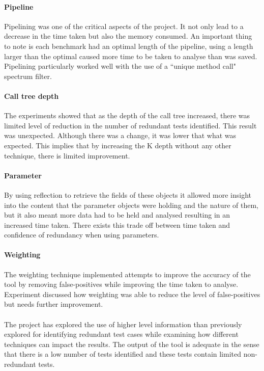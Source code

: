 \paragraph{Pipeline}
Pipelining was one of the critical aspects of the project. It not only lead to a decrease in the time taken but also the memory consumed. An important thing to note is each benchmark had an optimal length of the pipeline, using a length larger than the optimal caused more time to be taken to analyse than was saved. Pipelining particularly worked well with the use of a ``unique method call" spectrum filter.

\paragraph{Call tree depth}
The experiments showed that as the depth of the call tree increased, there was limited level of reduction in the number of redundant tests identified. This result was unexpected. Although there was a change, it was lower that what was expected. This implies that by increasing the K depth without any other technique, there is limited improvement. 

\paragraph{Parameter}
By using reflection to retrieve the fields of these objects it allowed more insight into the content that the parameter objects were holding and the nature of them, but it also meant more data had to be held and analysed resulting in an increased time taken. There exists this trade off between time taken and confidence of redundancy when using parameters. 

\paragraph{Weighting}
The weighting technique implemented attempts to improve the accuracy of the tool by removing false-positives while improving the time taken to analyse. Experiment  discussed how weighting was able to reduce the level of false-positives but needs further improvement.

\paragraph{}
The project has explored the use of higher level information than previously explored for identifying redundant test cases while examining how different techniques can impact the results. The output of the tool is adequate in the sense that there is a low number of tests identified and these tests contain limited non-redundant tests. 


